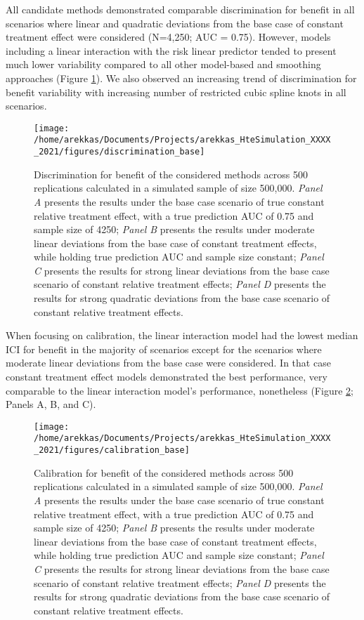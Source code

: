 \documentclass{article}
\begin{document}
All candidate methods demonstrated comparable discrimination for benefit
in all scenarios where linear and quadratic deviations from the base
case of constant treatment effect were considered (N=4,250; AUC = 0.75).
However, models including a linear interaction with the risk linear
predictor tended to present much lower variability compared to all other
model-based and smoothing approaches (Figure \ref{fig:discrimination}).
We also observed an increasing trend of discrimination for benefit
variability with increasing number of restricted cubic spline knots in
all scenarios.

\begin{figure}
\texttt{[image: /home/arekkas/Documents/Projects/arekkas\_HteSimulation\_XXXX\_2021/figures/discrimination\_base]} \caption{Discrimination for benefit of the considered methods across 500 replications calculated in a simulated sample of size 500,000. \textit{Panel A} presents the results under the base case scenario of true constant relative treatment effect, with a true prediction AUC of 0.75 and sample size of 4250; \textit{Panel B} presents the results under moderate linear deviations from the base case of constant treatment effects, while holding true prediction AUC and sample size constant; \textit{Panel C} presents the results for strong linear deviations from the base case scenario of constant relative treatment effects; \textit{Panel D} presents the results for strong quadratic deviations from the base case scenario of constant relative treatment effects.}\label{fig:discrimination}
\end{figure}

When focusing on calibration, the linear interaction model had the
lowest median ICI for benefit in the majority of scenarios except for
the scenarios where moderate linear deviations from the base case were
considered. In that case constant treatment effect models demonstrated
the best performance, very comparable to the linear interaction model's
performance, nonetheless (Figure \ref{fig:calibration}; Panels A, B, and
C).

\begin{figure}
\texttt{[image: /home/arekkas/Documents/Projects/arekkas\_HteSimulation\_XXXX\_2021/figures/calibration\_base]} \caption{Calibration for benefit of the considered methods across 500 replications calculated in a simulated sample of size 500,000. \textit{Panel A} presents the results under the base case scenario of true constant relative treatment effect, with a true prediction AUC of 0.75 and sample size of 4250; \textit{Panel B} presents the results under moderate linear deviations from the base case of constant treatment effects, while holding true prediction AUC and sample size constant; \textit{Panel C} presents the results for strong linear deviations from the base case scenario of constant relative treatment effects; \textit{Panel D} presents the results for strong quadratic deviations from the base case scenario of constant relative treatment effects.}\label{fig:calibration}
\end{figure}
\end{document}
